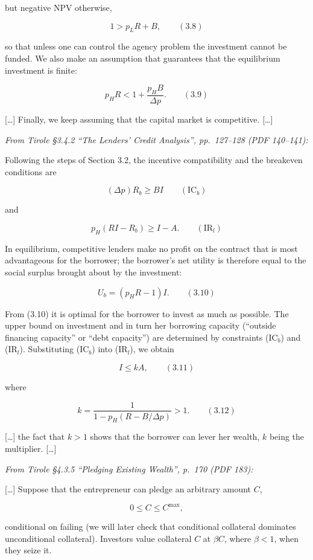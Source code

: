 \documentclass[11pt,a4paper]{article}
\begin{document}
but negative NPV otherwise,

\[1 > p_L R + B, \qquad (3.8)\]

so that unless one can control the agency problem the investment cannot be funded. We also make an
assumption that guarantees that the equilibrium investment is finite:

\[p_H R < 1 + \frac{p_H B}{\Delta p}. \qquad (3.9)\]

{[}\ldots{]} Finally, we keep assuming that the capital market is competitive. {[}\ldots{]}

\emph{From Tirole §3.4.2 ``The Lenders' Credit Analysis'', pp.~127--128 (PDF 140--141):}

Following the steps of Section 3.2, the incentive compatibility and the breakeven conditions are

\[(\Delta p) R_b \geqslant BI \qquad (\text{IC}_b)\]

and

\[p_H(RI - R_b) \geqslant I - A. \qquad (\text{IR}_l)\]

In equilibrium, competitive lenders make no profit on the contract that is most advantageous for the
borrower; the borrower's net utility is therefore equal to the social surplus brought about by the
investment:

\[U_b = (p_H R - 1) I. \qquad (3.10)\]

From (3.10) it is optimal for the borrower to invest as much as possible. The upper bound on
investment and in turn her borrowing capacity (``outside financing capacity'' or ``debt capacity'')
are determined by constraints (IC\(_b\)) and (IR\(_l\)). Substituting (IC\(_b\)) into (IR\(_l\)), we
obtain

\[I \leqslant kA, \qquad (3.11)\]

where

\[k = \frac{1}{1 - p_H(R - B/\Delta p)} > 1. \qquad (3.12)\]

{[}\ldots{]} the fact that \(k > 1\) shows that the borrower can lever her wealth, \(k\) being the
multiplier. {[}\ldots{]}

\emph{From Tirole §4.3.5 ``Pledging Existing Wealth'', p.~170 (PDF 183):}

{[}\ldots{]} Suppose that the entrepreneur can pledge an arbitrary amount \(C\),

\[0 \leqslant C \leqslant C^{\max},\]

conditional on failing (we will later check that conditional collateral dominates unconditional
collateral). Investors value collateral \(C\) at \(\beta C\), where \(\beta < 1\), when they seize
it.
\end{document}
